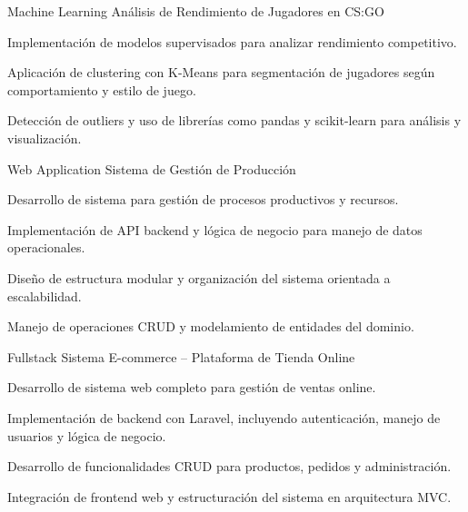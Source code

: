 \begin{cventries}
\cventry
  {Machine Learning}
  {Análisis de Rendimiento de Jugadores en CS:GO}
  {}
  {}
  {
    \begin{cvitems}
      \item {Implementación de modelos supervisados para analizar rendimiento competitivo.}
      \item {Aplicación de clustering con K-Means para segmentación de jugadores según comportamiento y estilo de juego.}
      \item {Detección de outliers y uso de librerías como pandas y scikit-learn para análisis y visualización.}
    \end{cvitems}
    \vspace{5mm}
  }

\cventry
  {Web Application}
  {Sistema de Gestión de Producción}
  {}
  {}
  {
    \begin{cvitems}
      \item {Desarrollo de sistema para gestión de procesos productivos y recursos.}
      \item {Implementación de API backend y lógica de negocio para manejo de datos operacionales.}
      \item {Diseño de estructura modular y organización del sistema orientada a escalabilidad.}
      \item {Manejo de operaciones CRUD y modelamiento de entidades del dominio.}
    \end{cvitems}
    \vspace{5mm}
  }
  
\cventry
  {Fullstack}
  {Sistema E-commerce – Plataforma de Tienda Online}
  {}
  {}
  {
    \begin{cvitems}
      \item {Desarrollo de sistema web completo para gestión de ventas online.}
      \item {Implementación de backend con Laravel, incluyendo autenticación, manejo de usuarios y lógica de negocio.}
      \item {Desarrollo de funcionalidades CRUD para productos, pedidos y administración.}
      \item {Integración de frontend web y estructuración del sistema en arquitectura MVC.}
    \end{cvitems}
    \vspace{5mm}
  }

\end{cventries}